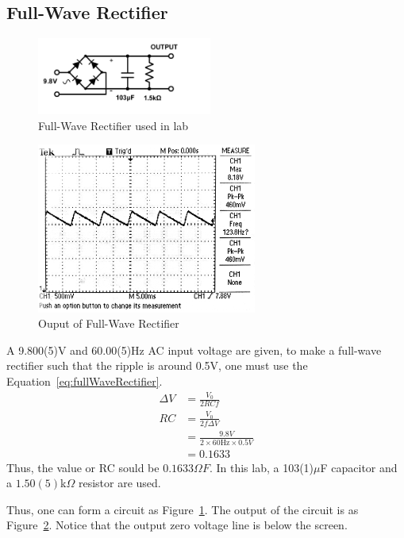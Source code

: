 \documentclass[aps,prl,reprint]{revtex4-1}
\begin{document}
    \subsection{Full-Wave Rectifier}
    \begin{figure}[t]
        \centering
        \includegraphics[height=1in]{image/ACDC-Lab.pdf}
        \caption{Full-Wave Rectifier used in lab}
        \label{fig:fullWaveRectifierCircuitLab}
    \end{figure}
    \begin{figure}[t]
        \centering
        \includegraphics[height=2.2in]{image/Full-Wave-Rectifier-Scope}
        \caption{Ouput of Full-Wave Rectifier}
        \label{fig:fullWaveRectifierScope}
    \end{figure}
    A 9.800(5)V and 60.00(5)Hz AC input voltage are given, to make a full-wave rectifier such that the ripple is around 0.5V, one must use the Equation~\ref{eq:fullWaveRectifier}. 
    \begin{align*}
        \Delta V &=\frac{V_0 }{2RCf} \\
        RC &= \frac{V_0}{2f\Delta V}\\
        &= \frac{9.8V}{2\times 60\text{Hz} \times 0.5V}\\
        &= 0.1633
    \end{align*}
    Thus, the value or RC sould be $0.1633 \Omega F$. In this lab, a 103(1)$\mu$F capacitor and a $1.50(5)$k$\Omega$ resistor are used. 


    Thus, one can form a circuit as Figure~\ref{fig:fullWaveRectifierCircuitLab}. The output of the circuit is as Figure~\ref{fig:fullWaveRectifierScope}. Notice that the output zero voltage line is below the screen.
\end{document}
